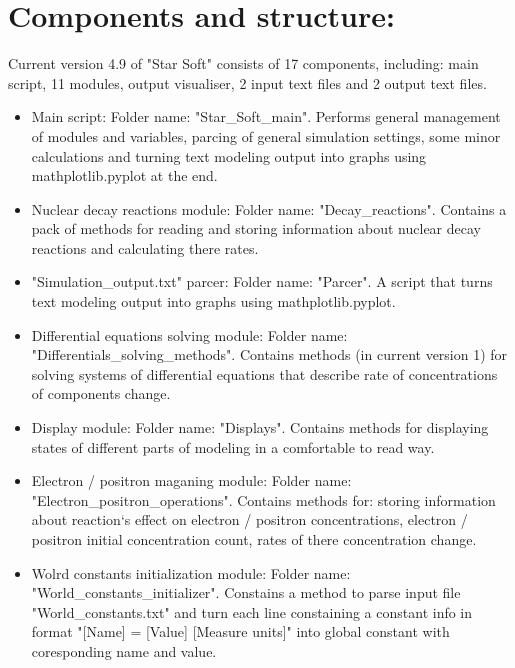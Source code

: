 \documentclass[a4paper,12pt]{article}
\begin{document}
\section{Components and structure:}

Current version 4.9 of "Star Soft" consists of 17 components, including: main script, 11 modules, output visualiser, 2 input text files and 2 output text files.

\begin{itemize}

\item Main script: Folder name: "Star\_Soft\_main". Performs general management of modules and variables, parcing of general simulation settings, some minor calculations and turning text modeling output into graphs using mathplotlib.pyplot at the end.

\item Nuclear decay reactions module: Folder name: "Decay\_reactions". Contains a pack of methods for reading and storing information about nuclear decay reactions and calculating there rates.

\item "Simulation\_output.txt" parcer: Folder name: "Parcer". A script that turns text modeling output into graphs using mathplotlib.pyplot.

\item Differential equations solving module: Folder name: "Differentials\_solving\_methods". Contains methods (in current version 1) for solving systems of differential equations that describe rate of concentrations of components change.

\item Display module: Folder name: "Displays". Contains methods for displaying states of different parts of modeling in a comfortable to read way.

\item Electron / positron maganing module: Folder name: "Electron\_positron\_operations". Contains methods for: storing information about reaction`s effect on electron / positron concentrations, electron / positron initial concentration count, rates of there concentration change.

\item Wolrd constants initialization module: Folder name: "World\_constants\_initializer". Constains a method to parse input file "World\_constants.txt" and turn each line constaining a constant info in format "[Name] = [Value] [Measure units]" into global constant with coresponding name and value.


\end{itemize}
\end{document}

